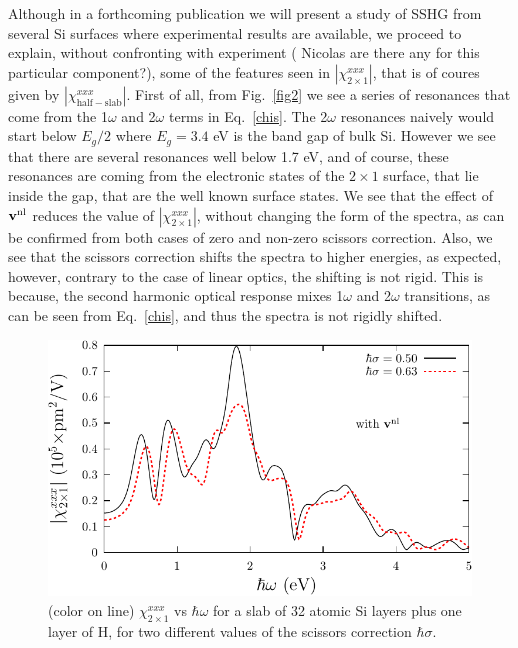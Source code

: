 \documentclass[floatfix,prb,aps,superscriptaddress,11pt,preprint,letterpaper]{revtex4}
\begin{document}
Although in a forthcoming publication we will present a study of SSHG
from several Si surfaces where experimental results are available, we
proceed to explain, without confronting with experiment ({\color{red}
Nicolas are there any for this particular component?}), some of the
features seen in 
$|\chi^{xxx}_{2\times 1}|$,  
that is of coures given by
$|\chi^{xxx}_{\mathrm{half-slab}}|$.
First of all, from Fig.~\ref{fig2} 
we see a series of resonances 
that come from the 1$\omega$ and 2$\omega$ terms in
Eq.~\eqref{chis}. The 2$\omega$ resonances naively would start below
$E_g/2$ where $E_g=3.4$ eV is
the band gap of bulk Si. However we see that there are several
resonances well below 1.7 eV, and of course, these resonances are
coming from the electronic states of the $2\times 1$ surface, that lie
inside the gap, that are the well known surface states.
We see that the effect of $\mathbf{v}^{\mathrm{nl}}$ reduces the value of   
$|\chi^{xxx}_{2\times 1}|$,\cite{note2}  
without changing the form of the spectra, as can be confirmed from
both cases of zero and non-zero scissors correction.
Also, we see that the scissors correction shifts the spectra to higher
energies, as expected, however, contrary to the case of linear optics,\cite{cabellosPRB09}
the shifting is not rigid. This is because, the second harmonic optical
response mixes 1$\omega$ and 2$\omega$ transitions, as can be seen from
Eq.~\eqref{chis}, and thus the spectra is not rigidly shifted. 
\begin{figure}
\centering 
\includegraphics[scale=.8]{plots/fig3}
\caption{(color on line) 
$\chi^{xxx}_{2\times 1}$
vs $\hbar\omega$ for a slab of 32 
atomic Si layers plus one layer of H, for two different values of 
the scissors correction $\hbar\sigma$.
\label{fig3}} 
\end{figure}
\end{document}
